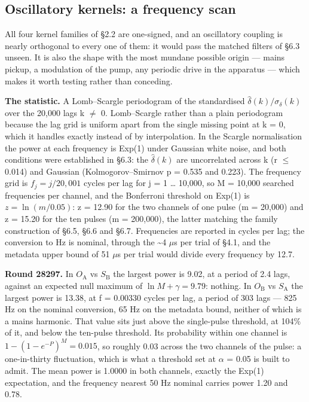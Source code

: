 \documentclass[
  11pt,
]{article}
\begin{document}
\subsection{Oscillatory kernels: a frequency scan}

All four kernel families of \S2.2 are one-signed, and an oscillatory
coupling is nearly orthogonal to every one of them: it would pass the
matched filters of \S6.3 unseen. It is also the shape with the most
mundane possible origin --- mains pickup, a modulation of the pump, any
periodic drive in the apparatus --- which makes it worth testing rather
than conceding.

\textbf{The statistic.} A Lomb--Scargle periodogram of the standardised
\(\hat\delta(k)/\sigma_\delta(k)\) over the 20,000 lags k \(\ne\) 0.
Lomb--Scargle rather than a plain periodogram because the lag grid is
uniform apart from the single missing point at k = 0, which it handles
exactly instead of by interpolation. In the Scargle normalisation the
power at each frequency is Exp(1) under Gaussian white noise, and both
conditions were established in \S6.3: the \(\hat\delta(k)\) are
uncorrelated across k (\textbar r\textbar{} \(\le\) 0.014) and Gaussian
(Kolmogorov--Smirnov p = 0.535 and 0.223). The frequency grid is
\(f_j = j/20{,}001\) cycles per lag for j = 1 \ldots{} 10,000, so M =
10,000 searched frequencies per channel, and the Bonferroni threshold on
Exp(1) is \(z = \ln(m/0.05)\): z = 12.90 for the two channels of one
pulse (m = 20,000) and z = 15.20 for the ten pulses (m = 200,000), the
latter matching the family construction of \S6.5, \S6.6 and \S6.7.
Frequencies are reported in cycles per lag; the conversion to Hz is
nominal, through the \textasciitilde4 \(\mu\)s per trial of \S4.1, and
the metadata upper bound of 51 \(\mu\)s per trial would divide every
frequency by 12.7.

\textbf{Round 28297.} In \(O_{\mathrm{A}}\) vs \(S_{\mathrm{B}}\) the
largest power is 9.02, at a period of 2.4 lags, against an expected null
maximum of \(\ln M + \gamma = 9.79\): nothing. In \(O_{\mathrm{B}}\) vs
\(S_{\mathrm{A}}\) the largest power is 13.38, at f = 0.00330 cycles per
lag, a period of 303 lags --- 825 Hz on the nominal conversion, 65 Hz on
the metadata bound, neither of which is a mains harmonic. That value
sits just above the single-pulse threshold, at 104\% of it, and below
the ten-pulse threshold. Its probability within one channel is
\(1-(1-e^{-P})^M = 0.015\), so roughly 0.03 across the two channels of
the pulse: a one-in-thirty fluctuation, which is what a threshold set at
\(\alpha\) = 0.05 is built to admit. The mean power is 1.0000 in both
channels, exactly the Exp(1) expectation, and the frequency nearest 50
Hz nominal carries power 1.20 and 0.78.
\end{document}
